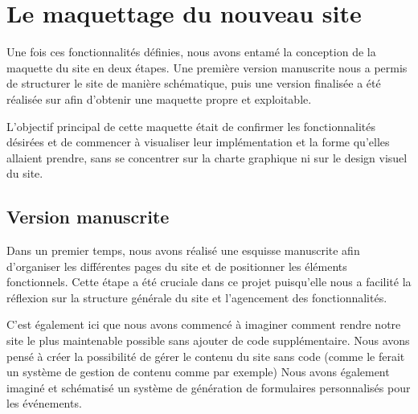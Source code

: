 \section{Le maquettage du nouveau site}
\label{sec:maquettage}


Une fois ces fonctionnalités définies, nous avons entamé la conception de la maquette du site en deux étapes. Une première version manuscrite nous a permis de structurer le site de manière schématique, puis une version finalisée a été réalisée sur  afin d’obtenir une maquette propre et exploitable.

L'objectif principal de cette maquette était de confirmer les fonctionnalités désirées et de commencer à visualiser leur implémentation et la forme qu'elles allaient prendre, sans se concentrer sur la charte graphique ni sur le design visuel du site.

\subsection{Version manuscrite}
\label{subsec:maquette-manuscrite}

Dans un premier temps, nous avons réalisé une esquisse manuscrite afin d’organiser les différentes pages du site et de positionner les éléments fonctionnels. Cette étape a été cruciale dans ce projet puisqu'elle nous a facilité la réflexion sur la structure générale du site et l'agencement des fonctionnalités.

C'est également ici que nous avons commencé à imaginer comment rendre notre site le plus maintenable possible sans ajouter de code supplémentaire. Nous avons pensé à créer la possibilité de gérer le contenu du site sans code (comme le ferait un système de gestion de contenu comme  par exemple)
Nous avons également imaginé et schématisé un système de génération de formulaires personnalisés pour les événements.


